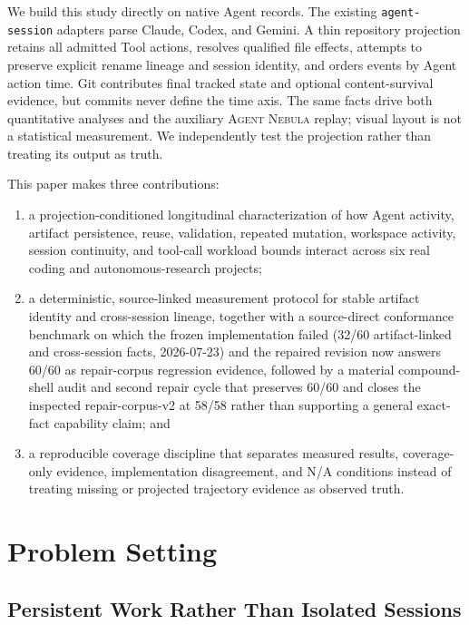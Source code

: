 \documentclass[letterpaper]{article}
\newcommand{\system}{\textsc{Agent Nebula}\xspace}
\newcommand{\artifact}[1]{\texttt{#1}}
\begin{document}
We build this study directly on native Agent records.  The existing
\artifact{agent-session} adapters parse Claude, Codex, and Gemini.  A thin
repository projection retains all admitted Tool actions, resolves qualified
file effects, attempts to preserve explicit rename lineage and session
identity, and orders events by Agent action time.  Git contributes final tracked state and
optional content-survival evidence, but commits never define the time axis.
The same facts drive both quantitative analyses and the auxiliary \system
replay; visual layout is not a statistical measurement.  We independently
test the projection rather than treating its output as truth.

This paper makes three contributions:

\begin{enumerate}[leftmargin=*,itemsep=2pt]
  \item a projection-conditioned longitudinal characterization of how Agent activity,
  artifact persistence, reuse, validation, repeated mutation, workspace
  activity, session continuity, and tool-call workload bounds interact across
  six real coding and autonomous-research projects;
  \item a deterministic, source-linked measurement protocol for stable
  artifact identity and cross-session lineage, together with a source-direct
  conformance benchmark on which the frozen implementation failed (32/60
  artifact-linked and cross-session facts, 2026-07-23) and the repaired
  revision now answers 60/60 as repair-corpus regression evidence, followed by
  a material compound-shell audit and second repair cycle that preserves
  60/60 and closes the inspected repair-corpus-v2 at 58/58 rather than
  supporting a general exact-fact capability claim; and
  \item a reproducible coverage discipline that separates measured results,
  coverage-only evidence, implementation disagreement, and N/A conditions
  instead of treating missing or projected trajectory evidence as observed
  truth.
\end{enumerate}

\section{Problem Setting}
\label{sec:problem}

\subsection{Persistent Work Rather Than Isolated Sessions}
\end{document}
